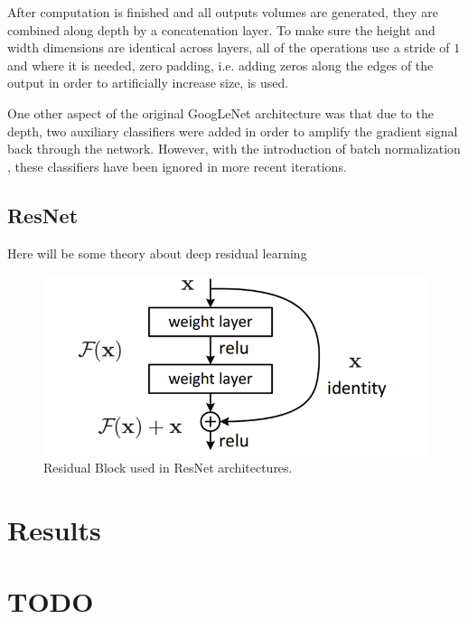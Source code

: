 \documentclass[preprint,12pt,3p]{elsarticle}
\begin{document}
After computation is finished and all outputs volumes are generated, they are combined along depth by a concatenation layer. To make sure the height and width dimensions are identical across layers, all of the operations use a stride of $1$ and where it is needed, zero padding, i.e. adding zeros along the edges of the output in order to artificially increase size, is used.

\medskip\noindent
One other aspect of the original GoogLeNet architecture was that due to the depth, two auxiliary classifiers were added in order to amplify the gradient signal back through the network. However, with the introduction of batch normalization \cite{ioffe2015batch}, these classifiers have been ignored in more recent iterations.

\subsection{ResNet}
Here will be some theory about deep residual learning \cite{he2015deep}

\begin{figure}
    \centering
    \includegraphics[scale=0.6]{figures/ResNet.png}
    \caption{Residual Block used in ResNet architectures.}
    \label{fig:res}
\end{figure}

\section{Results}










\newpage

\section{TODO}
\end{document}
